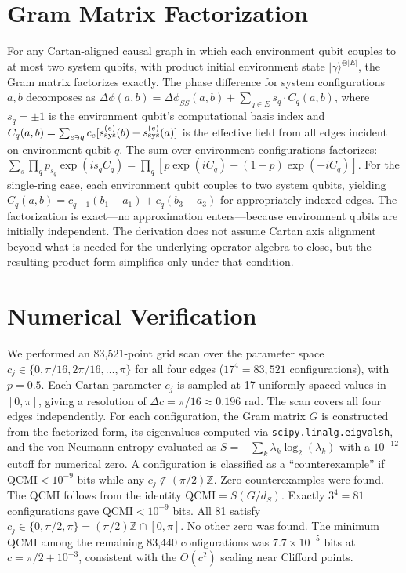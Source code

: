 \documentclass[aps,prl,superscriptaddress,nofootinbib]{revtex4-2}
\begin{document}
\section{Gram Matrix Factorization}


For any Cartan-aligned causal graph in which each environment qubit couples to at most two system qubits, with product initial environment state $|\gamma\rangle^{\otimes|E|}$, the Gram matrix factorizes exactly. The phase difference for system configurations $a,b$ decomposes as $\Delta\phi(a,b) = \Delta\phi_{SS}(a,b) + \sum_{q\in E} s_q \cdot C_q(a,b)$, where $s_q = \pm1$ is the environment qubit's computational basis index and $C_q(a,b) = \sum_{e\ni q} c_e [s^{(e)}_{\rm sys}(b) - s^{(e)}_{\rm sys}(a)]$ is the effective field from all edges incident on environment qubit $q$. The sum over environment configurations factorizes: $\sum_{s} \prod_q p_{s_q} \exp(i s_q C_q) = \prod_q [p\exp(iC_q) + (1-p)\exp(-iC_q)]$. For the single-ring case, each environment qubit couples to two system qubits, yielding $C_q(a,b) = c_{q-1}(b_1-a_1) + c_q(b_3-a_3)$ for appropriately indexed edges. The factorization is exact---no approximation enters---because environment qubits are initially independent. The derivation does not assume Cartan axis alignment beyond what is needed for the underlying operator algebra to close, but the resulting product form simplifies only under that condition.


\section{Numerical Verification}


We performed an 83,521-point grid scan over the parameter space $c_j \in \{0, \pi/16, 2\pi/16, \ldots, \pi\}$ for all four edges ($17^4 = 83,521$ configurations), with $p = 0.5$. Each Cartan parameter $c_j$ is sampled at 17 uniformly spaced values in $[0,\pi]$, giving a resolution of $\Delta c = \pi/16 \approx 0.196$ rad. The scan covers all four edges independently. For each configuration, the Gram matrix $G$ is constructed from the factorized form, its eigenvalues computed via \texttt{scipy.linalg.eigvalsh}, and the von Neumann entropy evaluated as $S = -\sum_k \lambda_k \log_2(\lambda_k)$ with a $10^{-12}$ cutoff for numerical zero. A configuration is classified as a ``counterexample'' if $\text{QCMI} < 10^{-9}$ bits while any $c_j \notin (\pi/2)\mathbb{Z}$. Zero counterexamples were found. The QCMI follows from the identity $\text{QCMI} = S(G/d_S)$. Exactly $3^4 = 81$ configurations gave $\text{QCMI} < 10^{-9}$ bits. All 81 satisfy $c_j \in \{0, \pi/2, \pi\} = (\pi/2)\mathbb{Z} \cap [0,\pi]$. No other zero was found. The minimum QCMI among the remaining 83,440 configurations was $7.7 \times 10^{-5}$ bits at $c = \pi/2 + 10^{-3}$, consistent with the $O(c^2)$ scaling near Clifford points.
\end{document}
